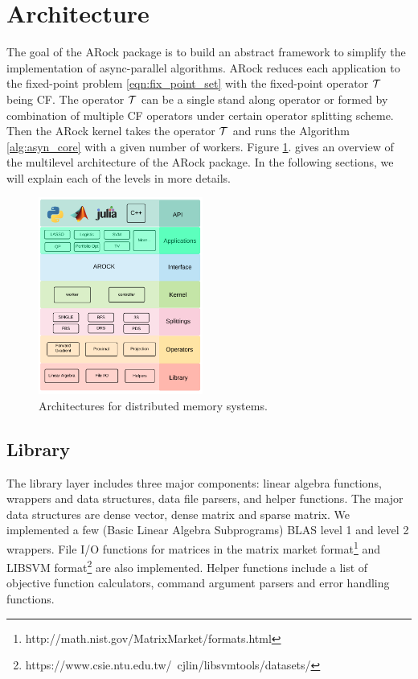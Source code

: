 \section{Architecture}
The goal of the ARock package is to build an abstract framework to simplify the implementation of async-parallel algorithms. ARock reduces each application to the fixed-point problem \eqref{eqn:fix_point_set} with the fixed-point operator ${\mathcal{T}}$ being CF. The operator ${\mathcal{T}}$ can be a single stand along operator or formed by combination of multiple CF operators under certain operator splitting scheme. Then the ARock kernel takes the operator ${\mathcal{T}}$ and runs the Algorithm \ref{alg:asyn_core} with a given number of workers.  Figure \ref{fig:arch}. gives an overview of the multilevel architecture of the ARock package. In the following sections, we will explain each of the levels in more details. 
\begin{figure}[!h]
      \centering
        \includegraphics[width=0.48\textwidth]{./figs/architecture.png}
      \caption{Architectures for distributed memory systems.}
        \label{fig:arch}
\end{figure}


\subsection{Library}
The library layer includes three major components: linear algebra functions, wrappers and data structures, data file parsers, and helper functions. The major data structures are dense vector, dense matrix and sparse matrix. We implemented a few (Basic Linear Algebra Subprograms) BLAS level 1 and level 2 wrappers. File I/O functions for matrices in the matrix market format\footnote{http://math.nist.gov/MatrixMarket/formats.html} and LIBSVM format\footnote{https://www.csie.ntu.edu.tw/~cjlin/libsvmtools/datasets/} are also implemented. Helper functions include a list of objective function calculators, command argument parsers and error handling functions. 


